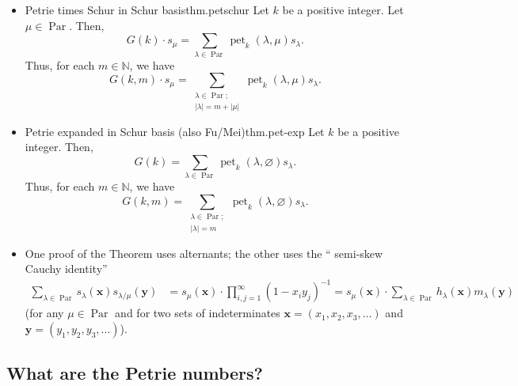 \documentclass[numbers=enddot,12pt,final,onecolumn,notitlepage]{scrartcl}%
\newcommand{\Par}{\operatorname{Par}}
\newcommand{\0}{\phantom{c}}
\let\sumnonlimits\sum
\let\prodnonlimits\prod
\renewcommand{\sum}{\sumnonlimits\limits}
\renewcommand{\prod}{\prodnonlimits\limits}
\newcommand{\nowbox}{\hphantom{x} \vspace{-1.5pc}}
\begin{document}
\begin{itemize}
\item \nowbox
\begin{theorem}{Petrie times Schur in Schur basis}{thm.petschur}
Let $k$ be a positive integer. Let $\mu\in
\operatorname*{Par}$. Then,%
\[
G\left(  k\right)  \cdot s_{\mu}=\sum_{\lambda\in\operatorname*{Par}%
}\operatorname*{pet}\nolimits_{k}\left(  \lambda,\mu\right)  s_{\lambda}.
\]
Thus, for each $m\in\mathbb{N}$, we have%
\[
G\left(  k,m\right)  \cdot s_{\mu}
=
\sum_{\substack{\lambda\in\Par;\\ \left|\lambda\right| =
m+\left\vert \mu\right\vert}}
\operatorname*{pet}\nolimits_{k}%
\left(  \lambda,\mu\right)  s_{\lambda}.
\]
\end{theorem}

\item \nowbox
\begin{corollary}{Petrie expanded in Schur basis (also Fu/Mei)}{thm.pet-exp}
Let $k$ be a positive integer. Then,%
\[
G\left(  k\right)  =\sum_{\lambda\in\operatorname*{Par}}\operatorname*{pet}%
\nolimits_{k}\left(  \lambda,\varnothing\right)  s_{\lambda}.
\]
Thus, for each $m\in\mathbb{N}$, we have%
\[
G\left(  k,m\right)  =
\sum_{\substack{\lambda\in\Par;\\ \left|\lambda\right| = m}}
\operatorname*{pet}\nolimits_{k}\left(  \lambda,\varnothing\right)
s_{\lambda}.
\]
\end{corollary}

\item
One proof of the Theorem uses alternants; the other uses the \textquotedblleft
semi-skew Cauchy identity\textquotedblright%
\begin{align*}
\sum_{\lambda\in\operatorname*{Par}}s_{\lambda}\left(  \mathbf{x}\right)
s_{\lambda/\mu}\left(  \mathbf{y}\right)   &  =s_{\mu}\left(  \mathbf{x}%
\right)  \cdot\prod_{i,j=1}^{\infty}\left(  1-x_{i}y_{j}\right)  ^{-1}
  =s_{\mu}\left(  \mathbf{x}\right)  \cdot\sum_{\lambda\in\operatorname*{Par}%
}h_{\lambda}\left(  \mathbf{x}\right)  m_{\lambda}\left(  \mathbf{y}\right)
\end{align*}
(for any $\mu\in\operatorname*{Par}$ and for two sets of indeterminates
$\mathbf{x}=\left(  x_{1},x_{2},x_{3},\ldots\right)  $ and $\mathbf{y}=\left(
y_{1},y_{2},y_{3},\ldots\right)  $).
\end{itemize}

\subsection{What are the Petrie numbers?}
\end{document}
